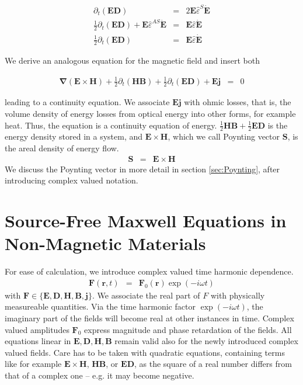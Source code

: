 \documentclass[12pt,a4paper,twoside,openright,BCOR10mm,headsepline,titlepage,abstracton,chapterprefix,final]{scrreprt}
\newcommand\Vector[1]{{\mathbf{#1}}}
\newcommand\Nabla{\Vector{\nabla}}
\newcommand\timederivative[1]{\dot{{#1}}}
\newcommand\Tensor[1]{\hat{#1}}
\newcommand\scalarEfield{E}
\newcommand\scalarBfield{B}
\newcommand\scalarHfield{H}
\newcommand\scalarDfield{D}
\newcommand\Efield{\Vector{\scalarEfield}}
\newcommand\Bfield{\Vector{\scalarBfield}}
\newcommand\Hfield{\Vector{\scalarHfield}}
\newcommand\Dfield{\Vector{\scalarDfield}}
\newcommand\permittivity{\Tensor{\scalarpermittivity}}
\newcommand\scalarpermittivity{\varepsilon}
\newcommand\currentdensity{\Vector{j}}
\begin{document}
\begin{eqnarray}
 \partial_t (\Efield \Dfield)                                                                  &=& 2 \Efield \permittivity^S \timederivative{\Efield} \\
 \frac{1}{2} \partial_t (\Efield \Dfield)+ \Efield \permittivity^{AS} \timederivative{\Efield} &=&   \Efield  \permittivity \timederivative{\Efield} \\
 \frac{1}{2} \partial_t (\Efield \Dfield)                                                      &=&   \Efield  \permittivity \timederivative{\Efield}
\end{eqnarray}

We derive an analogous equation for the magnetic field and insert both

\begin{eqnarray}
   \Nabla ( \Efield \times \Hfield ) + \frac{1}{2} \partial_t (\Hfield \Bfield) + \frac{1}{2} \partial_t (\Efield \Dfield) + \Efield \currentdensity &=& 0
\end{eqnarray}

leading to a continuity equation. 
We associate $\Efield \currentdensity$ with ohmic losses, that is, the volume density of energy losses from optical energy into other forms, for example heat.
Thus, the equation is a continuity equation of energy.
$\frac{1}{2} \Hfield \Bfield + \frac{1}{2} \Efield \Dfield$ is the energy density stored in a system, 
and $\Efield \times \Hfield$, which we call Poynting vector $\Vector{S}$, is the areal density of energy flow.
\begin{eqnarray}
 \Vector{S} &=& \Efield \times \Hfield
 \label{eq:definitionOfPoynting}
\end{eqnarray}
We discuss the Poynting vector in more detail in section \ref{sec:Poynting}, after introducing complex valued notation.

\section{Source-Free Maxwell Equations in Non-Magnetic Materials}
\label{sec:sourcefreemaxwell}
For ease of calculation, we introduce complex valued time harmonic dependence.
\begin{eqnarray}
 \Vector{F}(\Vector{r},t) &=& \Vector{F}_0(\Vector{r}) \exp(-i \omega t)
\end{eqnarray}
with $\Vector{F} \in \{ \Efield, \Dfield, \Hfield, \Bfield, \currentdensity \}$.
We associate the real part of $F$ with physically measureable quantities. 
Via the time harmonic factor $\exp(-i \omega t)$, the imaginary part of the fields will become real at other instances in time.
Complex valued amplitudes $\Vector{F}_0$ express magnitude and phase retardation of the fields.
All equations linear in $\Efield,\Dfield,\Hfield,\Bfield$ remain valid also for the newly introduced complex valued fields.
Care has to be taken with quadratic equations, 
containing terms like for example $\Efield \times \Hfield$, $\Hfield \Bfield$, or $\Efield \Dfield$,
as the square of a real number differs from that of a complex one -- e.g. it may become negative.
\end{document}
